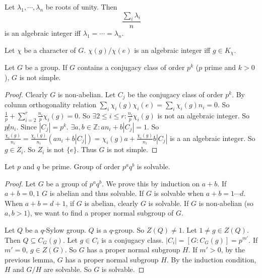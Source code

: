 \documentclass[12pt]{book}
\begin{document}
	\begin{lemma}
		Let $\lambda_1,\cdots,\lambda_n$ be roots of unity. Then
		\begin{equation}
			\frac{\sum_i\lambda_i}n
		\end{equation}
		is an algebraic integer iff $\lambda_1=\cdots=\lambda_n$.
	\end{lemma}
	
	\begin{corollary}
		Let $\chi$ be a character of $G$. $\chi(g)/\chi(e)$ is an algebraic integer iff $g\in K_\chi$.
	\end{corollary}
	
	\begin{lemma}
		Let $G$ be a group. If $G$ contains a conjugacy class of order $p^k$ ($p$ prime and $k>0$), $G$ is not simple.
	\end{lemma}
	\begin{proof}
		Clearly $G$ is non-abelian. Let $C_j$ be the conjugacy class of order $p^k$. By column orthogonality relation $\sum_i \chi_i(g)\chi_i(e)=\sum_i \chi_i(g)n_i=0$. So $\frac 1p+ \sum_{i=2}^r \frac {n_i}p\chi_i(g)=0$. So $\exists 2\leq i\leq r: \frac {n_i}p\chi_i(g)$ is not an algebraic integer. So $p\not| n_i$. Since $|C_j|=p^k$. $\exists a,b\in \mathbb Z: an_i+b|C_j|=1$. So $\frac {\chi_i(g)}{n_i}=\frac {\chi_i(g)}{n_i}(an_i+b|C_j|)=\chi_i(g)a+\frac {\chi_i(g)}{n_i}b|C_j|$ is a an algebraic integer. So $g\in Z_i$. So $Z_i$ is not $\{e\}$. Thus $G$ is not simple.
	\end{proof}	
	
	\begin{theorem}[Burnside]
		Let $p$ and $q$ be prime. Group of order $p^aq^b$ is solvable.
	\end{theorem}
	\begin{proof}
		Let $G$ be a group of $p^aq^b$. We prove this by induction on $a+b$. If $a+b=0,1$ $G$ is abelian and thus solvable. If $G$ is solvable when $a+b=1\cdots d$. When $a+b=d+1$, if $G$ is abelian, clearly $G$ is solvable. If $G$ is non-abelian (so $a,b>1$), we want to find a proper normal subgroup of $G$. 
		
		Let $Q$ be a $q$-Sylow group. $Q$ is a $q$-group. So $Z(Q)\neq 1$. Let $1\neq g\in Z(Q)$. Then $Q\subseteq C_G(g)$. Let $g\in C_i$ is a conjugacy class. $|C_i|=[G:C_G(g)]=p^{m'}$. If $m'=0$, $g\in Z(G)$. So $G$ has a proper normal subgroup $H$. If $m'>0$, by the previous lemma, $G$ has a proper normal subgroup $H$. By the induction condition, $H$ and $G/H$ are solvable. So $G$ is solvable.
	\end{proof}
	
\end{document}
